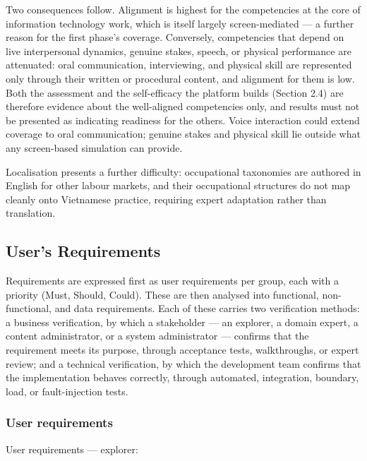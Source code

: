 Two consequences follow. Alignment is highest for the competencies at the core of information technology work, which is itself largely screen-mediated --- a further reason for the first phase's coverage. Conversely, competencies that depend on live interpersonal dynamics, genuine stakes, speech, or physical performance are attenuated: oral communication, interviewing, and physical skill are represented only through their written or procedural content, and alignment for them is low. Both the assessment and the self-efficacy the platform builds (Section 2.4) are therefore evidence about the well-aligned competencies only, and results must not be presented as indicating readiness for the others. Voice interaction could extend coverage to oral communication; genuine stakes and physical skill lie outside what any screen-based simulation can provide.

Localisation presents a further difficulty: occupational taxonomies are authored in English for other labour markets, and their occupational structures do not map cleanly onto Vietnamese practice, requiring expert adaptation rather than translation.

\subsection{User's Requirements}

Requirements are expressed first as user requirements per group, each with a priority (Must, Should, Could). These are then analysed into functional, non-functional, and data requirements. Each of these carries two verification methods: a business verification, by which a stakeholder --- an explorer, a domain expert, a content administrator, or a system administrator --- confirms that the requirement meets its purpose, through acceptance tests, walkthroughs, or expert review; and a technical verification, by which the development team confirms that the implementation behaves correctly, through automated, integration, boundary, load, or fault-injection tests.

\subsubsection{User requirements}

User requirements --- explorer:

